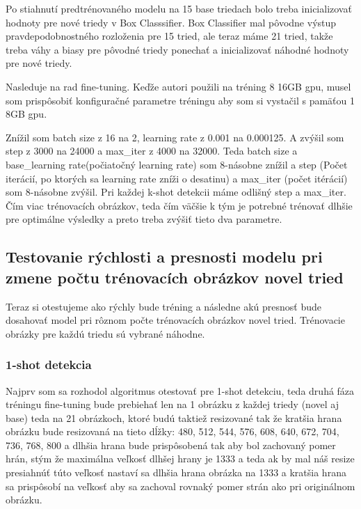 Po stiahnutí predtrénovaného modelu na 15 base triedach bolo treba inicializovať hodnoty pre nové triedy v Box Classsifier. Box Classifier mal pôvodne výstup pravdepodobnostného rozloženia pre 15 tried, ale teraz máme 21 tried, takže treba váhy a biasy pre pôvodné triedy ponechať a inicializovať náhodné hodnoty pre nové triedy. 

Nasleduje na rad fine-tuning. Keďže autori použili na tréning 8 16GB gpu, musel som prispôsobiť konfiguračné parametre tréningu aby som si vystačil s pamäťou 1 8GB gpu. 

Znížil som batch size z 16 na 2, learning rate z 0.001 na 0.000125. A zvýšil som step z 3000 na 24000 a max\_iter z 4000 na 32000. Teda batch size a base\_learning rate(počiatočný learning rate) som 8-násobne znížil a step (Počet iterácií, po ktorých sa learning rate zníži o desatinu) a max\_iter (počet itérácií) som 8-násobne zvýšil. Pri každej k-shot detekcii máme odlišný step a max\_iter. Čím viac trénovacích obrázkov, teda čím väčšie k tým je potrebné trénovať dlhšie pre optimálne výsledky a preto treba zvýšiť tieto dva parametre. 

\subsection{Testovanie rýchlosti a presnosti modelu pri zmene počtu trénovacích obrázkov novel tried}

Teraz si otestujeme ako rýchly bude tréning a následne akú presnosť bude dosahovať model pri rôznom počte trénovacích obrázkov novel tried. Trénovacie obrázky pre každú triedu sú vybrané náhodne. 

\subsubsection{1-shot detekcia}

Najprv som sa rozhodol algoritmus otestovať pre 1-shot detekciu, teda druhá fáza tréningu fine-tuning bude prebiehať len na 1 obrázku z každej triedy (novel aj base) teda na 21 obrázkoch, ktoré budú taktiež resizované tak že kratšia hrana obrázku bude resizovaná na tieto dĺžky: 480, 512, 544, 576, 608, 640, 672, 704, 736, 768, 800 a dlhšia hrana bude prispôsobená tak aby bol zachovaný pomer hrán, stým že maximálna veľkosť dlhšej hrany je 1333 a teda ak by mal náš resize presiahnúť túto veľkosť nastaví sa dlhšia hrana obrázka na 1333 a kratšia hrana sa prispôsobí na veľkosť aby sa zachoval rovnaký pomer strán ako pri originálnom obrázku. 

